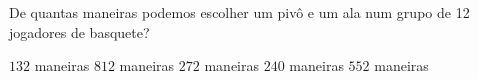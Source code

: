 De quantas maneiras podemos escolher um pivô e um ala num grupo de 12 jogadores de basquete?

$132$ maneiras
$812$ maneiras
$272$ maneiras
$240$ maneiras
$552$ maneiras



